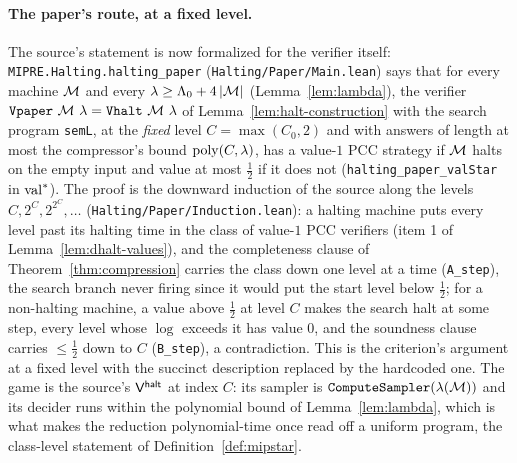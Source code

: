 \paragraph{The paper's route, at a fixed level.} The source's statement is now formalized
for the verifier itself: \texttt{MIPRE.Halting.halting\_paper}
(\texttt{Halting/Paper/Main.lean}) says that for every machine $\mathcal{M}$ and every
$\lambda \geq \Lambda_0 + 4\left\vert {\mathcal{M}} \right\vert$ (Lemma~\ref{lem:lambda}), the verifier
$\texttt{Vpaper}\ \mathcal{M}\ \lambda = \texttt{Vhalt}\ \mathcal{M}\ \lambda$ of
Lemma~\ref{lem:halt-construction} with the search program \texttt{semL}, at the
\emph{fixed} level $C = \max(C_0, 2)$ and with answers of length at most the compressor's
bound $\mathrm{poly}(C, \lambda)$, has a value-$1$ PCC strategy if $\mathcal{M}$ halts on the empty
input and value at most $\frac12$ if it does not (\texttt{halting\_paper\_valStar} in
$\mathrm{val}^*$). The proof is the downward induction of the source along the levels
$C, 2^C, 2^{2^C}, \ldots$ (\texttt{Halting/Paper/Induction.lean}): a halting machine puts
every level past its halting time in the class of value-$1$ PCC verifiers (item 1 of
Lemma~\ref{lem:dhalt-values}), and the completeness clause of Theorem~\ref{thm:compression}
carries the class down one level at a time (\texttt{A\_step}), the search branch never
firing since it would put the start level below $\frac12$; for a non-halting machine, a
value above $\frac12$ at level $C$ makes the search halt at some step, every level whose
$\log$ exceeds it has value $0$, and the soundness clause carries $\leq \frac12$ down to
$C$ (\texttt{B\_step}), a contradiction. This is the criterion's argument at a fixed level
with the succinct description replaced by the hardcoded one. The game is the source's
$\mathsf{V}^{\mathsf{halt}}$ at index $C$: its sampler is $\mathtt{ComputeSampler}(\lambda(\mathcal{M}))$ and its
decider runs within the polynomial bound of Lemma~\ref{lem:lambda}, which is what makes the
reduction polynomial-time once read off a uniform program, the class-level statement of
Definition~\ref{def:mipstar}.

